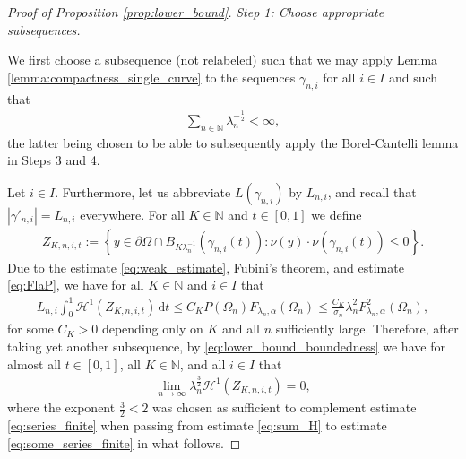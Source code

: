 \documentclass[11pt]{article}
\numberwithin{statement}{section}
\numberwithin{equation}{section}
\theoremstyle{remark}
\newcommand{\N}{\mathbb N}
\newcommand{\intd}{\, \mathrm{d}} 				%
\begin{document}
\begin{proof}[Proof of Proposition \ref{prop:lower_bound}]
	\textit{Step 1: Choose appropriate subsequences.}
	
	We first choose a subsequence (not relabeled) such that
        we may apply Lemma \ref{lemma:compactness_single_curve} to the
        sequences $\gamma_{n,i}$ for all $i \in I$ and such that
	\begin{align}\label{eq:series_finite}
		\sum_{n\in \N} \lambda_n^{-\frac{1}{2}} <\infty,
	\end{align}
        the latter being chosen to be able to subsequently apply the
        Borel-Cantelli lemma in Steps 3 and 4.
	
	Let $i \in I$. Furthermore, let us abbreviate
        $L(\gamma_{n,i})$ by $L_{n,i}$, and recall that
        $|\gamma'_{n,i}| = L_{n,i}$ everywhere.  For all $K \in \N$
        and $t\in [0,1]$ we define
	\begin{align}\label{def_Z_disint}
          Z_{K,n,i,t}:=  \left\{ y \in \partial \Omega \cap
          B_{K\lambda_n^{-1}}( \gamma_{n,i}(t)) : \nu(y) \cdot
          \nu(\gamma_{n,i}(t)) \leq 0 \right\}. 
	\end{align}
	Due to the estimate \eqref{eq:weak_estimate}, Fubini's
        theorem, and estimate \eqref{eq:FlaP}, we have for all
        $K\in \mathbb{N}$ and $i \in I$ that
	\begin{align}
          L_{n,i}  \int_0^1 \mathcal{H}^1(Z_{K,n,i,t})
          \intd t \leq C_K P(\Omega_n) F_{\lambda_n,
          \alpha}(\Omega_n) \leq \frac{C_K}{\sigma_n} \lambda_n^2
          F^2_{\lambda_n, 
          \alpha}(\Omega_n),
	\end{align}
	for some $C_K > 0$ depending only on $K$ and all $n$
          sufficiently large. Therefore, after taking yet another
        subsequence, by \eqref{eq:lower_bound_boundedness} we
        have for almost all $t\in [0,1]$, all $K \in \mathbb{N}$, and
        all $i \in I$ that
	\begin{align}\label{eq:measure_converge}
          \lim_{n \to \infty} \lambda_n^\frac{3}{2}
          \mathcal{H}^1(Z_{K,n,i,t})  = 0,
	\end{align}
	where the exponent $\tfrac32 < 2$ was chosen as
        sufficient to complement estimate \eqref{eq:series_finite}
        when passing from estimate \eqref{eq:sum_H} to estimate
        \eqref{eq:some_series_finite} in what follows.
	

\end{proof}
\end{document}
